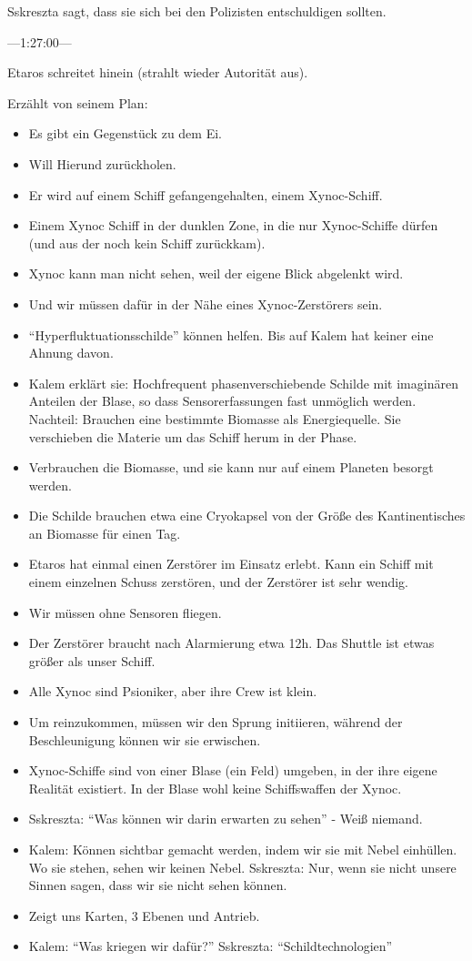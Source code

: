 \documentclass[11pt]{article}
\begin{document}
Sskreszta sagt, dass sie sich bei den Polizisten entschuldigen sollten.

---1:27:00---

Etaros schreitet hinein (strahlt wieder Autorität aus).

Erzählt von seinem Plan:

\begin{itemize}
\item
  Es gibt ein Gegenstück zu dem Ei.
\item
  Will Hierund zurückholen.
\item
  Er wird auf einem Schiff gefangengehalten, einem Xynoc-Schiff.
\item
  Einem Xynoc Schiff in der dunklen Zone, in die nur Xynoc-Schiffe
  dürfen (und aus der noch kein Schiff zurückkam).
\item
  Xynoc kann man nicht sehen, weil der eigene Blick abgelenkt wird.
\item
  Und wir müssen dafür in der Nähe eines Xynoc-Zerstörers sein.
\item
  ``Hyperfluktuationsschilde'' können helfen. Bis auf Kalem hat keiner
  eine Ahnung davon.
\item
  Kalem erklärt sie: Hochfrequent phasenverschiebende Schilde mit
  imaginären Anteilen der Blase, so dass Sensorerfassungen fast
  unmöglich werden. Nachteil: Brauchen eine bestimmte Biomasse als
  Energiequelle. Sie verschieben die Materie um das Schiff herum in der
  Phase.
\item
  Verbrauchen die Biomasse, und sie kann nur auf einem Planeten besorgt
  werden.
\item
  Die Schilde brauchen etwa eine Cryokapsel von der Größe des
  Kantinentisches an Biomasse für einen Tag.
\item
  Etaros hat einmal einen Zerstörer im Einsatz erlebt. Kann ein Schiff
  mit einem einzelnen Schuss zerstören, und der Zerstörer ist sehr
  wendig.
\item
  Wir müssen ohne Sensoren fliegen.
\item
  Der Zerstörer braucht nach Alarmierung etwa 12h. Das Shuttle ist etwas
  größer als unser Schiff.
\item
  Alle Xynoc sind Psioniker, aber ihre Crew ist klein.
\item
  Um reinzukommen, müssen wir den Sprung initiieren, während der
  Beschleunigung können wir sie erwischen.
\item
  Xynoc-Schiffe sind von einer Blase (ein Feld) umgeben, in der ihre
  eigene Realität existiert. In der Blase wohl keine Schiffswaffen der
  Xynoc.
\item
  Sskreszta: ``Was können wir darin erwarten zu sehen'' - Weiß niemand.
\item
  Kalem: Können sichtbar gemacht werden, indem wir sie mit Nebel
  einhüllen. Wo sie stehen, sehen wir keinen Nebel. Sskreszta: Nur, wenn
  sie nicht unsere Sinnen sagen, dass wir sie nicht sehen können.
\item
  Zeigt uns Karten, 3 Ebenen und Antrieb.
\item
  Kalem: ``Was kriegen wir dafür?'' Sskreszta: ``Schildtechnologien''
\end{itemize}
\end{document}
